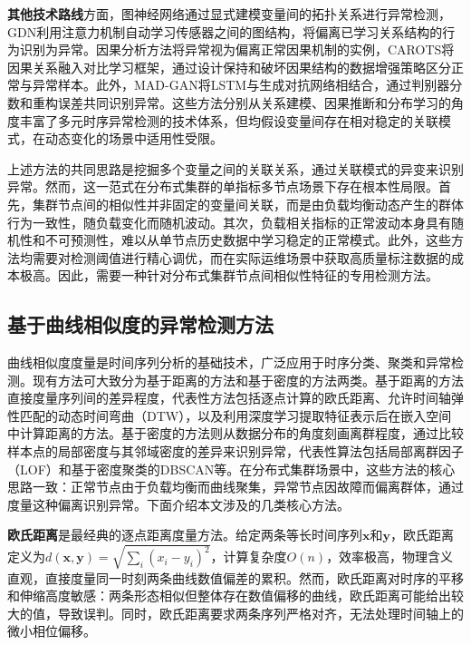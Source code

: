 \documentclass[10.5pt,a4paper,twocolumn]{ctexart}
\begin{document}
\textbf{其他技术路线}方面，图神经网络通过显式建模变量间的拓扑关系进行异常检测，GDN\cite{deng2021graph}利用注意力机制自动学习传感器之间的图结构，将偏离已学习关系结构的行为识别为异常。因果分析方法将异常视为偏离正常因果机制的实例，CAROTS\cite{chen2025carots}将因果关系融入对比学习框架，通过设计保持和破坏因果结构的数据增强策略区分正常与异常样本。此外，MAD-GAN\cite{li2019madgan}将LSTM与生成对抗网络相结合，通过判别器分数和重构误差共同识别异常。这些方法分别从关系建模、因果推断和分布学习的角度丰富了多元时序异常检测的技术体系，但均假设变量间存在相对稳定的关联模式，在动态变化的场景中适用性受限。

上述方法的共同思路是挖掘多个变量之间的关联关系，通过关联模式的异变来识别异常。然而，这一范式在分布式集群的单指标多节点场景下存在根本性局限。首先，集群节点间的相似性并非固定的变量间关联，而是由负载均衡动态产生的群体行为一致性，随负载变化而随机波动。其次，负载相关指标的正常波动本身具有随机性和不可预测性，难以从单节点历史数据中学习稳定的正常模式。此外，这些方法均需要对检测阈值进行精心调优，而在实际运维场景中获取高质量标注数据的成本极高。因此，需要一种针对分布式集群节点间相似性特征的专用检测方法。

\subsection{基于曲线相似度的异常检测方法}

曲线相似度度量是时间序列分析的基础技术，广泛应用于时序分类、聚类和异常检测。现有方法可大致分为基于距离的方法和基于密度的方法两类。基于距离的方法直接度量序列间的差异程度，代表性方法包括逐点计算的欧氏距离、允许时间轴弹性匹配的动态时间弯曲（DTW）\cite{berndt1994dtw}，以及利用深度学习提取特征表示后在嵌入空间中计算距离的方法。基于密度的方法则从数据分布的角度刻画离群程度，通过比较样本点的局部密度与其邻域密度的差异来识别异常，代表性算法包括局部离群因子（LOF）\cite{breunig2000lof}和基于密度聚类的DBSCAN\cite{ester1996dbscan}等。在分布式集群场景中，这些方法的核心思路一致：正常节点由于负载均衡而曲线聚集，异常节点因故障而偏离群体，通过度量这种偏离识别异常。下面介绍本文涉及的几类核心方法。

\textbf{欧氏距离}是最经典的逐点距离度量方法。给定两条等长时间序列$\mathbf{x}$和$\mathbf{y}$，欧氏距离定义为$d(\mathbf{x}, \mathbf{y}) = \sqrt{\sum_i(x_i - y_i)^2}$，计算复杂度$O(n)$，效率极高，物理含义直观，直接度量同一时刻两条曲线数值偏差的累积。然而，欧氏距离对时序的平移和伸缩高度敏感：两条形态相似但整体存在数值偏移的曲线，欧氏距离可能给出较大的值，导致误判。同时，欧氏距离要求两条序列严格对齐，无法处理时间轴上的微小相位偏移。
\end{document}
